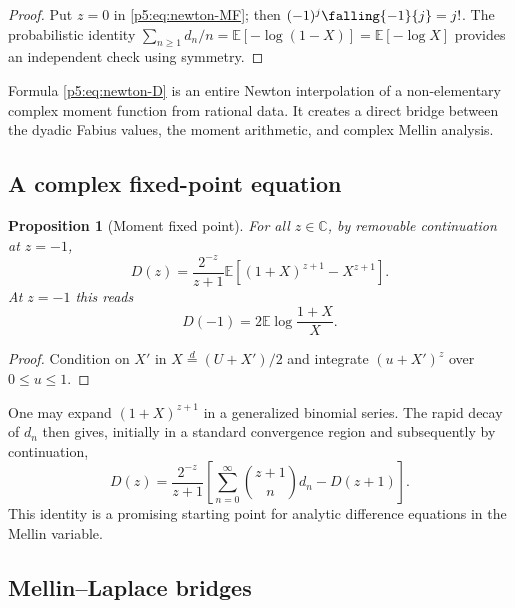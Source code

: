 \documentclass[11pt,oneside]{article}
\newtheorem{proposition}[theorem]{Proposition}
\theoremstyle{definition}
\theoremstyle{remark}
\newcommand{\E}{\mathbb E}
\newcommand{\C}{\mathbb C}
\newcommand{\1}{\mathbf 1}
\begin{document}
\begin{proof}
Put $z=0$ in \eqref{p5:eq:newton-MF}; then
$(-1)^j\falling{-1}{j}=j!$.  The probabilistic identity
$\sum_{n\ge1}d_n/n=\E[-\log(1-X)]=\E[-\log X]$
provides an independent check using symmetry.
\end{proof}

\newresultPartii Formula \eqref{p5:eq:newton-D} is an entire Newton interpolation of a non-elementary complex moment function from rational data.  It creates a direct bridge between the dyadic Fabius values, the moment arithmetic, and complex Mellin analysis.

\subsection{A complex fixed-point equation}

\begin{proposition}[Moment fixed point]\label{p5:prop:D-fixed-point}
For all $z\in\C$, by removable continuation at $z=-1$,
\begin{equation}\label{p5:eq:D-fixed-point}
 D(z)=\frac{2^{-z}}{z+1}
 \E\left[(1+X)^{z+1}-X^{z+1}\right].
\end{equation}
At $z=-1$ this reads
\begin{equation}
 D(-1)=2\E\log\frac{1+X}{X}.
\end{equation}
\end{proposition}

\begin{proof}
Condition on $X'$ in $X\overset d=(U+X')/2$ and integrate $(u+X')^z$ over $0\le u\le1$.
\end{proof}

One may expand $(1+X)^{z+1}$ in a generalized binomial series.  The rapid decay of $d_n$ then gives, initially in a standard convergence region and subsequently by continuation,
\begin{equation}\label{p5:eq:D-binomial-functional}
 D(z)=\frac{2^{-z}}{z+1}
 \left[\sum_{n=0}^{\infty}\binom{z+1}{n}d_n-D(z+1)\right].
\end{equation}
This identity is a promising starting point for analytic difference equations in the Mellin variable.

\subsection{Mellin--Laplace bridges}
\end{document}
